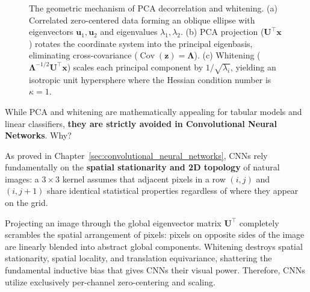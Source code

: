 \begin{figure}[H]
\caption{The geometric mechanism of PCA decorrelation and whitening. (a) Correlated zero-centered data forming an oblique ellipse with eigenvectors $\mathbf{u}_1, \mathbf{u}_2$ and eigenvalues $\lambda_1, \lambda_2$. (b) PCA projection ($\mathbf{U}^\top \mathbf{x}$) rotates the coordinate system into the principal eigenbasis, eliminating cross-covariance ($\operatorname{Cov}(\mathbf{z}) = \boldsymbol{\Lambda}$). (c) Whitening ($\boldsymbol{\Lambda}^{-1/2} \mathbf{U}^\top \mathbf{x}$) scales each principal component by $1/\sqrt{\lambda_i}$, yielding an isotropic unit hypersphere where the Hessian condition number is $\kappa = 1$.}
\label{fig:pca_whitening_geometry}
\end{figure}

\begin{examinsight}
While PCA and whitening are mathematically appealing for tabular models and linear classifiers, \textbf{they are strictly avoided in Convolutional Neural Networks}. Why?

As proved in Chapter~\ref{sec:convolutional_neural_networks}, CNNs rely fundamentally on the \textbf{spatial stationarity and 2D topology} of natural images: a $3 \times 3$ kernel assumes that adjacent pixels in a row $(i, j)$ and $(i, j+1)$ share identical statistical properties regardless of where they appear on the grid. 

Projecting an image through the global eigenvector matrix $\mathbf{U}^\top$ completely scrambles the spatial arrangement of pixels: pixels on opposite sides of the image are linearly blended into abstract global components. Whitening destroys spatial stationarity, spatial locality, and translation equivariance, shattering the fundamental inductive bias that gives CNNs their visual power. Therefore, CNNs utilize exclusively per-channel zero-centering and scaling.
\end{examinsight}


